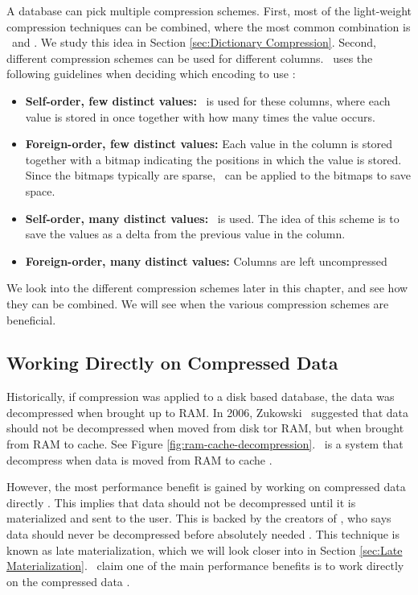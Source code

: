 A database can pick multiple compression schemes. First, most of the light-weight compression techniques can be combined, where the most common combination is \de~and \bp. We study this idea in Section \ref{sec:Dictionary Compression}. Second, different compression schemes can be used for different columns. \cstore~uses the following guidelines when deciding which encoding to use \cite{Stonebraker2005-qz}:
\begin{itemize}
  \item \textbf{Self-order, few distinct values:} \rle~is used for these columns, where each value is stored in once together with how many times the value occurs.
  \item \textbf{Foreign-order, few distinct values:} Each value in the column is stored together with a bitmap indicating the positions in which the value is stored. Since the bitmaps typically are sparse, \rle~can be applied to the bitmaps to save space.
  \item \textbf{Self-order, many distinct values:} \dele~is used. The idea of this scheme is to save the values as a delta from the previous value in the column.
  \item \textbf{Foreign-order, many distinct values:} Columns are left uncompressed
\end{itemize}

We look into the different compression schemes later in this chapter, and see how they can be combined. We will see when the various compression schemes are beneficial.

\subsection{Working Directly on Compressed Data}
\label{sub:Working Directly on Compressed Data}
Historically, if compression was applied to a disk based database, the data was decompressed when brought up to RAM. In 2006, Zukowski \ea~suggested that data should not be decompressed when moved from disk tor RAM, but when brought from RAM to cache. See Figure \ref{fig:ram-cache-decompression}. \monetx~is a system that decompress when data is moved from RAM to cache \cite{Johnson2008-cp}.

However, the most performance benefit is gained by working on compressed data directly \cite{Lemke2010-is}. This implies that data should not be decompressed until it is materialized and sent to the user. This is backed by the creators of \blink, who says data should never be decompressed before absolutely needed \cite{Barber2012-xt}. This technique is known as late materialization, which we will look closer into in Section \ref{sec:Late Materialization}. \oracle~claim one of the main performance benefits is to work directly on the compressed data \cite{Oracle2015-fs}.


